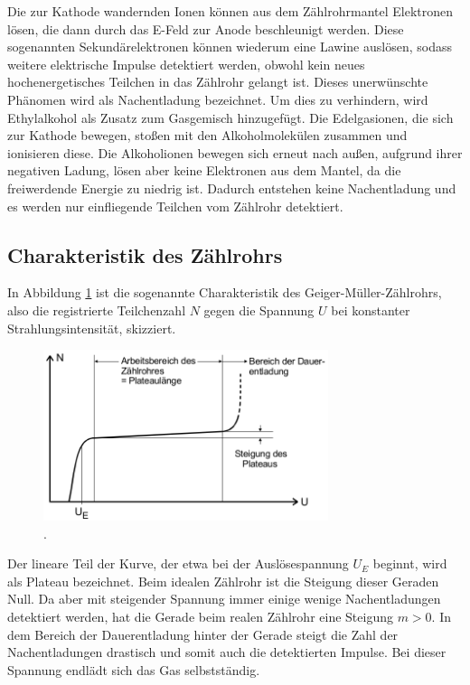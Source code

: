 Die zur Kathode wandernden Ionen können aus dem Zählrohrmantel Elektronen lösen,
die dann durch das E-Feld zur Anode beschleunigt werden. Diese sogenannten
Sekundärelektronen können wiederum eine Lawine auslösen, sodass weitere
elektrische Impulse detektiert werden, obwohl kein neues hochenergetisches
Teilchen in das Zählrohr gelangt ist. Dieses unerwünschte Phänomen
wird als Nachentladung bezeichnet. Um dies zu verhindern, wird
Ethylalkohol als Zusatz zum Gasgemisch hinzugefügt. Die Edelgasionen, die
sich zur Kathode bewegen, stoßen mit den Alkoholmolekülen zusammen und
ionisieren diese. Die Alkoholionen bewegen sich erneut nach außen, aufgrund
ihrer negativen Ladung, lösen aber keine Elektronen aus dem Mantel, da
die freiwerdende Energie zu niedrig ist. Dadurch entstehen keine Nachentladung
und es werden nur einfliegende Teilchen vom Zählrohr detektiert.

\subsection{Charakteristik des Zählrohrs}

In Abbildung \ref{fig:GMB} ist die sogenannte Charakteristik des
Geiger-Müller-Zählrohrs, also die registrierte Teilchenzahl $N$ gegen die
Spannung $U$ bei konstanter Strahlungsintensität, skizziert.

\begin{figure}
  \centering
  \includegraphics[height=5cm]{MeinePics;)/GMB.png}
  \caption{.\cite{anleitung}}
  \label{fig:GMB}
\end{figure}

\FloatBarrier

Der lineare Teil der Kurve, der etwa bei der Auslösespannung $U_E$ beginnt,
wird als Plateau bezeichnet.
Beim idealen Zählrohr ist die Steigung dieser Geraden Null. Da aber mit
steigender Spannung immer einige wenige Nachentladungen detektiert werden,
hat die Gerade beim realen Zählrohr eine Steigung $m > 0$.
In dem Bereich der Dauerentladung hinter der Gerade steigt die Zahl der
Nachentladungen drastisch und somit auch die detektierten Impulse.
Bei dieser Spannung endlädt sich das Gas selbstständig.

